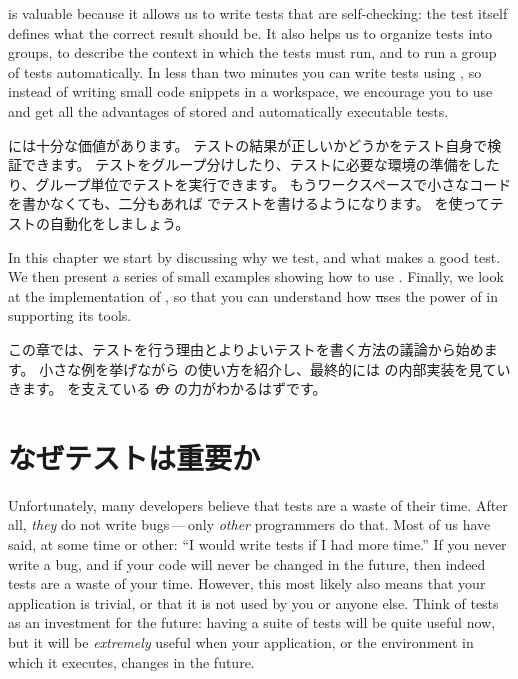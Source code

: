 \documentclass[a4paper,10pt,twoside]{book}
\begin{document}
\sunit is valuable because it allows us to write tests that are self-checking:
the test itself defines what the correct result should be.
It also helps us to
organize tests into groups, to describe the context in which the tests must run, and to
run a group of tests
automatically.  In less than two minutes you can write tests using
\sunit, so instead of writing small code snippets in a workspace, we encourage you
to use \sunit and get all the
advantages of stored and automatically executable tests.
\fi

\sunit には十分な価値があります。
テストの結果が正しいかどうかをテスト自身で検証できます。
テストをグループ分けしたり、テストに必要な環境の準備をしたり、グループ単位でテストを実行できます。
もうワークスペースで小さなコードを書かなくても、二分もあれば \sunit でテストを書けるようになります。
\sunit を使ってテストの自動化をしましょう。

In this chapter we start by discussing why we test, and what makes a good test. We then present a series of small 
examples showing how to use \sunit.
Finally, we look at the implementation of \sunit, so that you can understand how
\st uses the power of  in supporting its tools. 
\fi

この章では、テストを行う理由とよりよいテストを書く方法の議論から始めます。
小さな例を挙げながら \sunit の使い方を紹介し、最終的には \sunit の内部実装を見ていきます。
\sunit を支えている \st の  の力がわかるはずです。

\section{なぜテストは重要か}

Unfortunately, many developers believe that tests are a waste of their time.  
After all, \emph{they} do not write bugs\,---\,only \emph{other} programmers do that.
Most of us have said, at some time or other:
``I would write tests if I had more time.''
If you never write a bug, and if your code will never be changed in the future,
then indeed tests are a waste of your time.
However, this most likely
also means that your application is trivial, or that it is not used by you or anyone else.  
Think of tests as an investment for the future: having a
suite of tests will be quite useful now, but it will be \emph{extremely} useful when
your application, or the environment in which it executes, changes in the future.
\fi
\end{document}
